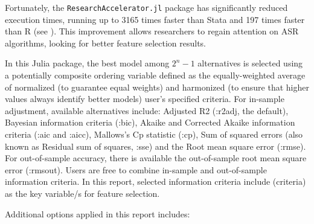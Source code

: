 \documentclass{article}
\begin{document}
Fortunately, the \verb|ResearchAccelerator.jl| package has significantly reduced execution times, running up to 3165 times faster than Stata and 197 times faster than R (see \cite{gsreg2019}). This improvement allows researchers to regain attention on ASR algorithms, looking for better feature selection results.

In this Julia package, the best model among $2^{n}-1$ alternatives is selected using a potentially composite ordering variable defined as the equally-weighted average of normalized (to guarantee equal weights) and harmonized (to ensure that higher values always identify better models) user's specified criteria. For in-sample adjustment, available alternatives include: Adjusted R2 (:r2adj, the default), Bayesian information criteria (:bic), Akaike and Corrected Akaike information criteria (:aic and :aicc), Mallows's Cp statistic (:cp), Sum of squared errors (also known as Residual sum of squares, :sse) and the Root mean square error (:rmse). For out-of-sample accuracy, there is available the out-of-sample root mean square error (:rmsout). Users are free to combine in-sample and out-of-sample information criteria. In this report, selected information criteria include ({{criteria}}) as the key variable/s for feature selection.

Additional options applied in this report includes:
\end{document}
